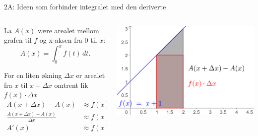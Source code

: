 
\blueheader
\begin{frame}{2A: Ideen som forbinder integralet med den deriverte}
\begin{columns}[onlytextwidth]
  \begin{column}{0.45\textwidth}
    La \(A(x)\) være arealet mellom grafen til \(f\)  og x-aksen fra \(0\) til \(x\):
    \[
    A(x)=\int_{0}^{x} f(t)\,dt.
    \]

    For en liten økning \(\Delta x\) er arealet fra \(x\) til \(x+\Delta x\) omtrent lik $ f(x)\cdot\Delta x$
    \begin{align*}
      A(x+\Delta x)-A(x) &\approx f(x)\,\Delta x\\[0.8em]
      \frac{A(x+\Delta x)-A(x)}{\Delta x} &\approx f(x)\\[0.8em]
      A'(x) &\approx f(x)
    \end{align*}
  \end{column}
  \begin{column}{0.55\textwidth}
    \centering
    \includegraphics[width=\linewidth]{R2-K2A-4.png}
  \end{column}
\end{columns}
\end{frame}

